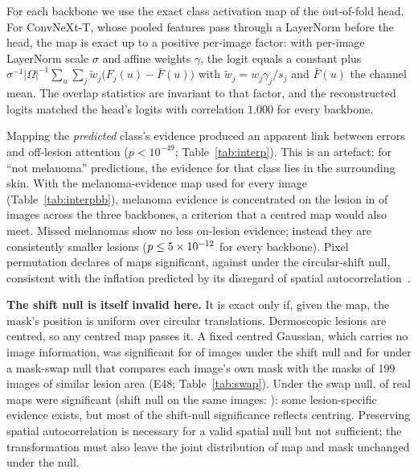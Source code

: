 \documentclass[conference]{IEEEtran}
\begin{document}



For each backbone we use the exact class activation map of the out-of-fold head. For ConvNeXt-T, whose pooled features pass through a LayerNorm before the head, the map is exact up to a positive per-image factor: with per-image LayerNorm scale $\sigma$ and affine weights $\gamma$, the logit equals a constant plus $\sigma^{-1}|\Omega|^{-1}\sum_u\sum_j \tilde w_j\big(F_j(u)-\bar F(u)\big)$ with $\tilde w_j=w_j\gamma_j/s_j$ and $\bar F(u)$ the channel mean. The overlap statistics are invariant to that factor, and the reconstructed logits matched the head's logits with correlation $1.000$ for every backbone.

Mapping the \emph{predicted} class's evidence produced an apparent link between errors and off-lesion attention ($p<10^{-49}$; Table~\ref{tab:interp}). This is an artefact: for ``not melanoma'' predictions, the evidence for that class lies in the surrounding skin. With the melanoma-evidence map used for every image (Table~\ref{tab:interpbb}), melanoma evidence is concentrated on the lesion in \INTbbEnrichRange{} of images across the three backbones, a criterion that a centred map would also meet. Missed melanomas show no less on-lesion evidence; instead they are consistently smaller lesions ($p\le5\times10^{-12}$ for every backbone). Pixel permutation declares \INTbbPermRange{} of maps significant, against \INTbbShiftRange{} under the circular-shift null, consistent with the inflation predicted by its disregard of spatial autocorrelation~\cite{alexanderbloch2018,markello2022neuromaps}.

\textbf{The shift null is itself invalid here.} It is exact only if, given the map, the mask's position is uniform over circular translations. Dermoscopic lesions are centred, so any centred map passes it. A fixed centred Gaussian, which carries no image information, was significant for \GAUSSshift{} of images under the shift null and for \GAUSSswap{} under a mask-swap null that compares each image's own mask with the masks of 199 images of similar lesion area (E48; Table~\ref{tab:swap}). Under the swap null, \SWAPrange{} of real maps were significant (shift null on the same images: \SWAPshiftRange{}): some lesion-specific evidence exists, but most of the shift-null significance reflects centring. Preserving spatial autocorrelation is necessary for a valid spatial null but not sufficient; the transformation must also leave the joint distribution of map and mask unchanged under the null.

\clearpage


\end{document}
